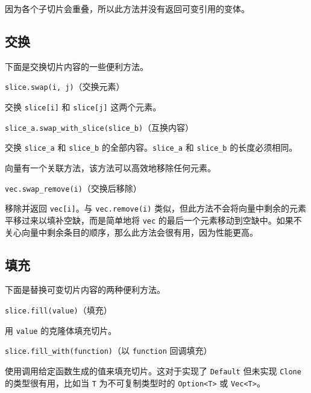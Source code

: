 因为各个子切片会重叠，所以此方法并没有返回可变引用的变体。

\subsection{交换}

下面是交换切片内容的一些便利方法。

\begin{mySidenote}
\texttt{slice.swap(i, j)}（交换元素）
\end{mySidenote}

交换 \texttt{slice[i]} 和 \texttt{slice[j]} 这两个元素。

\begin{myNote}
\texttt{slice\_a.swap\_with\_slice(slice\_b)}（互换内容）
\end{myNote}

交换 \texttt{slice\_a} 和 \texttt{slice\_b} 的全部内容。\texttt{slice\_a} 和 \texttt{slice\_b} 的长度必须相同。

向量有一个关联方法，该方法可以高效地移除任何元素。

\begin{mySidenote}
\texttt{vec.swap\_remove(i)}（交换后移除）
\end{mySidenote}

移除并返回 \texttt{vec[i]}。与 \texttt{vec.remove(i)} 类似，但此方法不会将向量中剩余的元素平移过来以填补空缺，而是简单地将 \texttt{vec} 的最后一个元素移动到空缺中。如果不关心向量中剩余条目的顺序，那么此方法会很有用，因为性能更高。

\subsection{填充}

下面是替换可变切片内容的两种便利方法。

\begin{mySidenote}
\texttt{slice.fill(value)}（填充）
\end{mySidenote}

用 \texttt{value} 的克隆体填充切片。

\begin{myNote}
\texttt{slice.fill\_with(function)}（以 \texttt{function} 回调填充）
\end{myNote}

使用调用给定函数生成的值来填充切片。这对于实现了 \texttt{Default} 但未实现 \texttt{Clone} 的类型很有用，比如当 \texttt{T} 为不可复制类型时的 \texttt{Option<T>} 或 \texttt{Vec<T>}。

